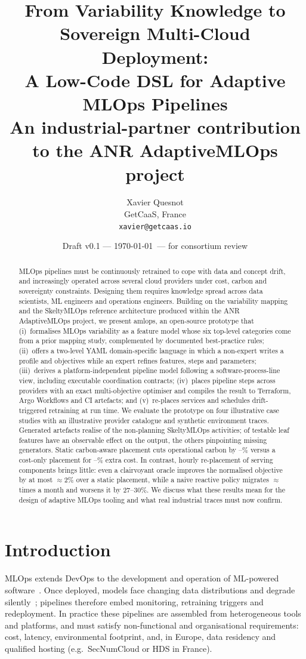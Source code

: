 \documentclass[10pt,a4paper]{article}
\title{From Variability Knowledge to Sovereign Multi-Cloud Deployment:\\
A Low-Code DSL for Adaptive MLOps Pipelines\\[4pt]
\large An industrial-partner contribution to the ANR AdaptiveMLOps project}
\author{Xavier Quesnot\\ GetCaaS, France\\ \texttt{xavier@getcaas.io}}
\date{Draft v0.1 --- \today\ --- for consortium review}
\newcommand{\tool}{\textsf{amlops}}
\begin{document}
\maketitle

\begin{abstract}
MLOps pipelines must be continuously retrained to cope with data and concept
drift, and increasingly operated across several cloud providers under cost,
carbon and sovereignty constraints. Designing them requires knowledge spread
across data scientists, ML engineers and operations engineers. Building on the
variability mapping and the SkeltyMLOps reference architecture produced within the
ANR AdaptiveMLOps project, we present \tool, an open-source prototype that
(i)~formalises MLOps variability as a feature model whose six top-level
categories come from a prior mapping study, complemented by documented
best-practice rules; (ii)~offers a two-level YAML domain-specific language in
which a non-expert writes a profile and objectives while an expert refines
features, steps and parameters; (iii)~derives a platform-independent pipeline
model following a software-process-line view, including executable coordination
contracts; (iv)~places pipeline steps across providers with an exact
multi-objective optimiser and compiles the result to Terraform, Argo Workflows
and CI artefacts; and (v)~re-places services and schedules drift-triggered
retraining at run time. We evaluate the prototype on four illustrative case
studies with an illustrative provider catalogue and synthetic environment traces.
Generated artefacts realise \CovNonPlan{} of the non-planning SkeltyMLOps
activities; \FeatEffective{} of \FeatTested{} testable leaf features have an
observable effect on the output, the others pinpointing missing generators.
Static carbon-aware placement cuts operational carbon by
\CarbonSavingChurn--\CarbonSavingRetail\% versus a cost-only placement for
\CostExtraChurn--\CostExtraRetail\% extra cost. In contrast, hourly re-placement of
serving components brings little: even a clairvoyant oracle improves the
normalised objective by at most \(\approx\)2\% over a static placement, while a
naive reactive policy migrates \(\approx\)\MigAReactive{} times a month and worsens it
by 27--30\%. We discuss what these results mean for the design of adaptive
MLOps tooling and what real industrial traces must now confirm.
\end{abstract}

\section{Introduction}
MLOps extends DevOps to the development and operation of ML-powered
software~\cite{kreuzberger2023,sculley2015}. Once deployed, models face changing
data distributions and degrade silently~\cite{gama2014}; pipelines therefore embed
monitoring, retraining triggers and redeployment. In practice these pipelines are
assembled from heterogeneous tools and platforms, and must satisfy
non-functional and organisational requirements: cost, latency, environmental
footprint, and, in Europe, data residency and qualified hosting (e.g.\ SecNumCloud
or HDS in France).
\end{document}
